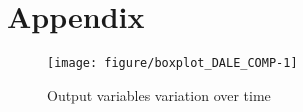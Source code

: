 \documentclass[12pt,a4paper]{article}\usepackage[]{graphicx}\usepackage[]{color}
\newenvironment{knitrout}{}{} %
\begin{document}
\newpage
\section{Appendix}


\begin{knitrout}
\color{fgcolor}\begin{figure}[htbp]

{\centering \texttt{[image: figure/boxplot\_DALE\_COMP-1]} 

}

\caption[Output variables variation over time]{Output variables variation over time}\label{fig:boxplot_DALE_COMP}
\end{figure}


\end{knitrout}




\end{document}
